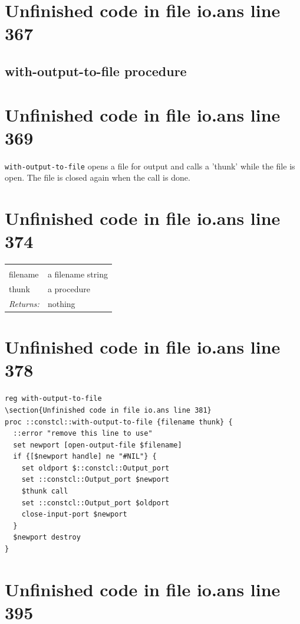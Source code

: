 \documentclass[twoside,9pt]{report}
\begin{document}
\section{Unfinished code in file io.ans line 367}
\subsection{with-output-to-file procedure}
\label{with-output-to-file-procedure}
\section{Unfinished code in file io.ans line 369}


\texttt{with-output-to-file} opens a file for output and calls a 'thunk' while the file is open. The file is closed again when the call is done.

\section{Unfinished code in file io.ans line 374}
\noindent\begin{tabular}{ |p{1.9cm} p{8cm}| }
\hline
\rowcolor[HTML]{CCCCCC} \multicolumn{2}{|l|}{\bf with-output-to-file (public)} \\
filename & a filename string \\
thunk & a procedure \\
\textit{Returns:} & nothing \\
\hline
\end{tabular}
\section{Unfinished code in file io.ans line 378}
\begin{lstlisting}
reg with-output-to-file
\section{Unfinished code in file io.ans line 381}
proc ::constcl::with-output-to-file {filename thunk} {
  ::error "remove this line to use"
  set newport [open-output-file $filename]
  if {[$newport handle] ne "#NIL"} {
    set oldport $::constcl::Output_port
    set ::constcl::Output_port $newport
    $thunk call
    set ::constcl::Output_port $oldport
    close-input-port $newport
  }
  $newport destroy
}
\end{lstlisting}
\section{Unfinished code in file io.ans line 395}
\end{document}

